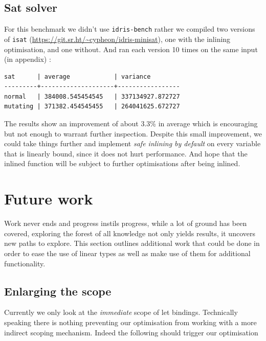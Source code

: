 \documentclass[
]{article}
\begin{document}
\hypertarget{sat-solver}{%
\subsection{Sat solver}\label{sat-solver}}

For this benchmark we didn't use \texttt{idris-bench} rather we compiled
two versions of \texttt{isat}
(\url{https://git.sr.ht/~cypheon/idris-minisat}), one with the inlining
optimisation, and one without. And ran each version 10 times on the same
input (in appendix) :

\begin{verbatim}
sat      | average            | variance
---------+--------------------+-----------------
normal   | 384008.545454545   | 337134927.872727
mutating | 371382.454545455   | 264041625.672727
\end{verbatim}

The results show an improvement of about 3.3\% in average which is
encouraging but not enough to warrant further inspection. Despite this
small improvement, we could take things further and implement \emph{safe
inlining by default} on every variable that is linearly bound, since it
does not hurt performance. And hope that the inlined function will be
subject to further optimisations after being inlined.

\newpage

\hypertarget{future-work}{%
\section{Future work}\label{future-work}}

Work never ends and progress instils progress, while a lot of ground has
been covered, exploring the forest of all knowledge not only yields
results, it uncovers new paths to explore. This section outlines
additional work that could be done in order to ease the use of linear
types as well as make use of them for additional functionality.

\hypertarget{enlarging-the-scope}{%
\subsection{Enlarging the scope}\label{enlarging-the-scope}}

Currently we only look at the \emph{immediate} scope of let bindings.
Technically speaking there is nothing preventing our optimisation from
working with a more indirect scoping mechanism. Indeed the following
should trigger our optimisation
\end{document}
